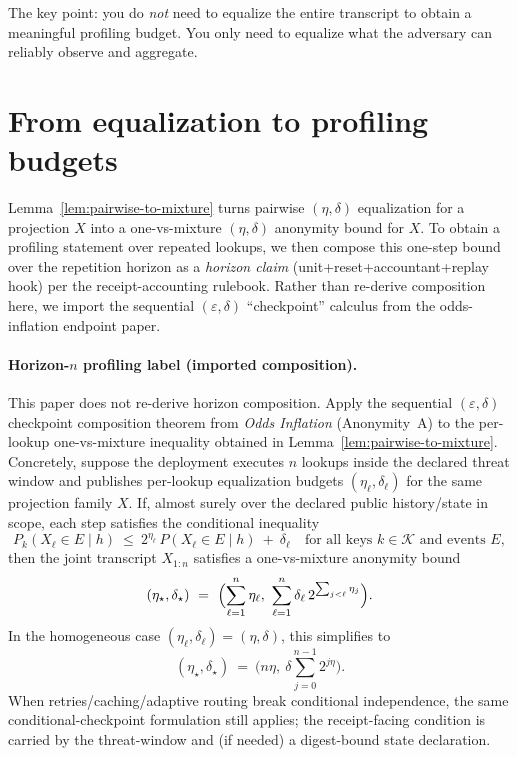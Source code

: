 \documentclass[11pt]{article}
\begin{document}
The key point: you do \emph{not} need to equalize the entire transcript to obtain a meaningful profiling budget.
You only need to equalize what the adversary can reliably observe and aggregate.

\section{From equalization to profiling budgets}
Lemma~\ref{lem:pairwise-to-mixture} turns pairwise $(\eta,\delta)$ equalization for a projection $X$ into a one-vs-mixture $(\eta,\delta)$ anonymity bound for $X$.
To obtain a profiling statement over repeated lookups, we then compose this one-step bound over the repetition horizon as a \emph{horizon claim} (unit+reset+accountant+replay hook) per the receipt-accounting rulebook.\cite{series:accountingrulebook,series:threatwindows}
Rather than re-derive composition here, we import the sequential $(\varepsilon,\delta)$ ``checkpoint'' calculus from the odds-inflation endpoint paper.\cite{series:oddsinflation}

\paragraph{Horizon-$n$ profiling label (imported composition).}
This paper does not re-derive horizon composition.
Apply the sequential $(\varepsilon,\delta)$ checkpoint composition theorem from \emph{Odds Inflation} (Anonymity~A) to the per-lookup one-vs-mixture inequality obtained in Lemma~\ref{lem:pairwise-to-mixture}.\cite{series:oddsinflation}
Concretely, suppose the deployment executes $n$ lookups inside the declared threat window and publishes per-lookup equalization budgets $(\eta_\ell,\delta_\ell)$ for the same projection family $X$.
If, almost surely over the declared public history/state in scope, each step satisfies the conditional inequality
\[
P_k(X_\ell\in E\mid h)\ \le\ 2^{\eta_\ell}\,P(X_\ell\in E\mid h)\ +\ \delta_\ell
\quad\text{for all keys }k\in\mathcal K\text{ and events }E,
\]
then the joint transcript $X_{1:n}$ satisfies a one-vs-mixture anonymity bound
\[
(\eta_\star,\delta_\star)\ =\ \Bigl(\sum_{\ell=1}^n \eta_\ell,\ \sum_{\ell=1}^n \delta_\ell\,2^{\sum_{j<\ell}\eta_j}\Bigr).
\]
In the homogeneous case $(\eta_\ell,\delta_\ell)=(\eta,\delta)$, this simplifies to
\[
(\eta_\star,\delta_\star)\ =\ \bigl(n\eta,\ \delta\sum_{j=0}^{n-1}2^{j\eta}\bigr).
\]
When retries/caching/adaptive routing break conditional independence, the same conditional-checkpoint formulation still applies; the receipt-facing condition is carried by the threat-window and (if needed) a digest-bound state declaration.\cite{series:threatwindows,series:state1,series:planstateequiv}
\end{document}

